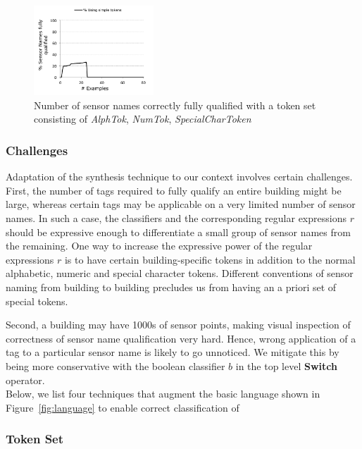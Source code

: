 \begin{figure}[h!]
  
  \centering
    \includegraphics[width=0.40\textwidth]{figs/gulwani-noconverge.pdf}
\caption{Number of sensor names correctly fully qualified with a token set consisting of {\it AlphTok}, {\it NumTok}, {\it SpecialCharToken}}
\label{fig:simpleTokenNoCoverage}
\end{figure}

\subsubsection{Challenges}

Adaptation of the synthesis technique to our context involves certain challenges. First, the number of tags required to fully qualify an entire building might be large, whereas certain tags may be applicable on a very limited number of sensor names. In such a case, the classifiers and the corresponding regular expressions $r$ should be expressive enough to differentiate a small group of sensor names from the remaining. One way to increase the expressive power of the regular expressions $r$ is to have certain building-specific tokens in addition to the normal alphabetic, numeric and special character tokens. Different conventions of sensor naming from building to building precludes us from having an a priori set of special tokens.

Second, a building may have 1000s of sensor points, making visual inspection of correctness of sensor name qualification very hard. Hence, wrong application of a tag to a particular sensor name is likely to go unnoticed. We mitigate this by being more conservative with the boolean classifier $b$ in the top level {\bf Switch} operator. \\


Below, we list four techniques that augment the basic language shown in Figure~\ref{fig:language} to enable correct classification of 

\subsubsection{Token Set}


